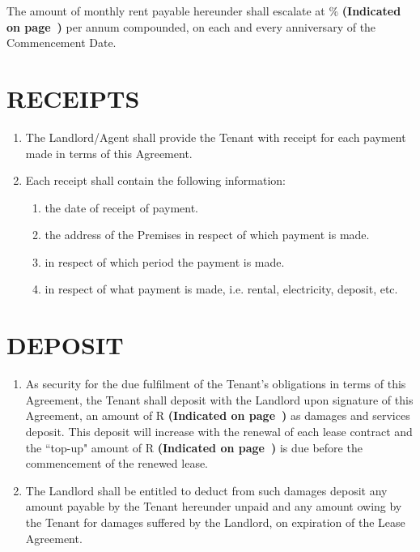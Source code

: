 \documentclass[11pt]{article}
\begin{document}
The amount of monthly rent payable hereunder shall escalate at \underline{\hspace{2em}}\% \textbf{(Indicated on page~\pageref{input:escalation-percentage})} per annum compounded, on each and every anniversary of the Commencement Date.

\section{\uppercase{receipts}}

\begin{enumerate}
	\item The Landlord/Agent shall provide the Tenant with receipt for each payment made in terms of this Agreement.
	\item Each receipt shall contain the following information:
		\begin{enumerate}
			\item the date of receipt of payment.
			\item the address of the Premises in respect of which payment is made.
			\item in respect of which period the payment is made.
			\item in respect of what payment is made, i.e. rental, electricity, deposit, etc.
		\end{enumerate}
\end{enumerate}

\section{\uppercase{deposit}}
\label{sec:deposit}

\begin{enumerate}
	\item As security for the due fulfilment of the Tenant's obligations in terms of this Agreement, the Tenant shall deposit with the Landlord upon signature of this Agreement, an amount of R\underline{\hspace{6em}} \textbf{(Indicated on page~\pageref{input:deposit})} as damages and services deposit. This deposit will increase with the renewal of each lease contract and the ``top-up" amount of R\underline{\hspace{6em}} \textbf{(Indicated on page~\pageref{input:deposit-top-up})} is due before the commencement of the renewed lease. \label{deposit-description}
	\item The Landlord shall be entitled to deduct from such damages deposit any amount payable by the Tenant hereunder unpaid and any amount owing by the Tenant for damages suffered by the Landlord, on expiration of the Lease Agreement.
\end{enumerate}
\end{document}
